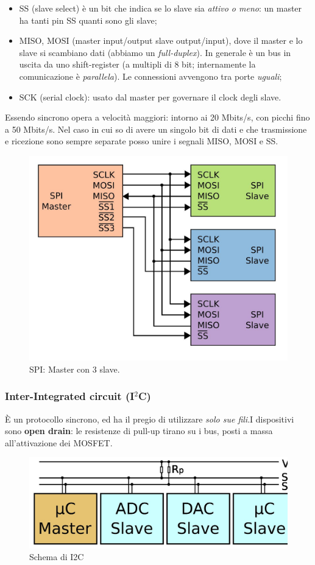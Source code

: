 \documentclass[
]{book}
\providecommand{\tightlist}{%
  \setlength{\itemsep}{0pt}\setlength{\parskip}{0pt}}
\begin{document}
\begin{itemize}
\tightlist
\item
  SS (slave select) è un bit che indica se lo slave sia \emph{attivo o
  meno}: un master ha tanti pin SS quanti sono gli slave;
\item
  MISO, MOSI (master input/output slave output/input), dove il master e
  lo slave si scambiano dati (abbiamo un \emph{full-duplex}). In
  generale è un bus in uscita da uno shift-register (a multipli di 8
  bit; internamente la comunicazione è \emph{parallela}). Le connessioni
  avvengono tra porte \emph{uguali};
\item
  SCK (serial clock): usato dal master per governare il clock degli
  slave.
\end{itemize}

Essendo sincrono opera a velocità maggiori: intorno ai 20 Mbits/s, con
picchi fino a 50 Mbits/s. Nel caso in cui so di avere un singolo bit di
dati e che trasmissione e ricezione sono sempre separate posso unire i
segnali MISO, MOSI e SS.

\begin{figure}
\centering
\includegraphics[width=0.3\linewidth,height=\textheight,keepaspectratio]{assets/imgs/spi.jpg}
\caption{SPI: Master con 3 slave.}
\end{figure}

\subsubsection{\texorpdfstring{Inter-Integrated circuit
(I\(^2\)C)}{Inter-Integrated circuit (I\^{}2C)}}\label{inter-integrated-circuit-i2c}

È un protocollo sincrono, ed ha il pregio di utilizzare \emph{solo sue
fili}.\newline I dispositivi sono \textbf{open drain}: le resistenze di
pull-up tirano su i bus, posti a massa all'attivazione dei MOSFET.

\begin{figure}
\centering
\includegraphics[width=0.5\linewidth,height=\textheight,keepaspectratio]{assets/imgs/I2C.jpg}
\caption{Schema di I2C}
\end{figure}
\end{document}
